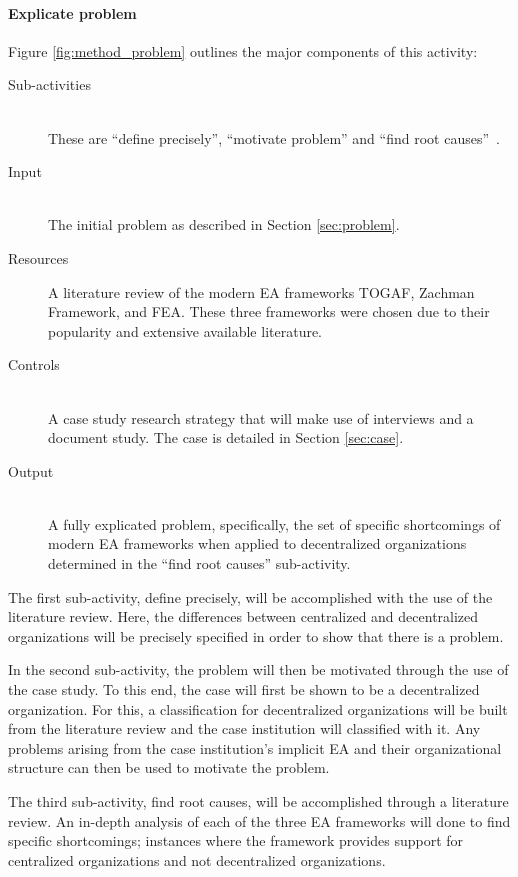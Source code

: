 \paragraph*{Explicate problem}

Figure \ref{fig:method_problem} outlines the major components of this activity:

\begin{description}
  \item[Sub-activities] \hfill \\ These are ``define precisely'', ``motivate problem'' and ``find root causes''~\cite[Ch. 5]{johannessonPerjons2012}.
  \item[Input] \hfill \\ The initial problem as described in Section \ref{sec:problem}.
  \item[Resources] A literature review of the modern EA frameworks TOGAF, Zachman Framework, and FEA. These three frameworks were chosen due to their popularity and extensive available literature.
  \item[Controls] \hfill \\ A case study research strategy that will make use of interviews and a document study. The case is detailed in Section \ref{sec:case}. 
  \item[Output] \hfill \\ A fully explicated problem, specifically, the set of specific shortcomings of modern EA frameworks when applied to decentralized organizations determined in the ``find root causes'' sub-activity.
\end{description}

The first sub-activity, define precisely, will be accomplished with the use of the literature review. Here, the differences between centralized and decentralized  organizations will be precisely specified in order to show that there is a problem. 

In the second sub-activity, the problem will then be motivated through the use of the case study. To this end, the case will first be shown to be a decentralized organization. For this, a classification for decentralized organizations will be built from the literature review and the case institution will classified with it. Any problems arising from the case institution's implicit EA and their organizational structure can then be used to motivate the problem. 

The third sub-activity, find root causes, will be accomplished through a literature review. An in-depth analysis of each of the three EA frameworks will done to find specific shortcomings; instances where the framework provides support for centralized organizations and not decentralized organizations. 

